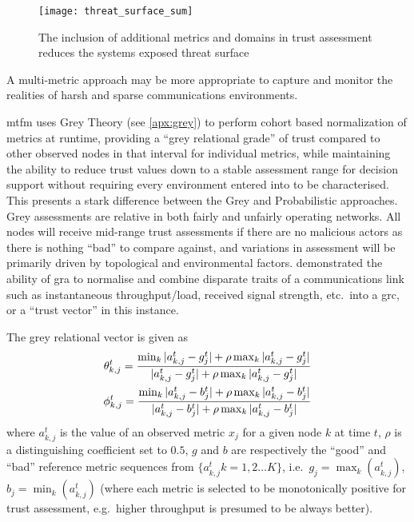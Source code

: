 \begin{figure}[h!]
  \centering
  \texttt{[image: threat\_surface\_sum]}
  \caption{The inclusion of additional metrics and domains in trust assessment reduces the systems exposed threat surface}
  \label{fig:threat_surface}
\end{figure}

A multi-metric approach may be more appropriate to capture and monitor the realities of harsh and sparse communications environments.

\gls{mtfm}\cite{Guo11} uses Grey Theory (see \autoref{apx:grey}) to perform cohort based normalization of metrics at runtime, providing a ``grey relational grade'' of trust compared to other observed nodes in that interval for individual metrics, while maintaining the ability to reduce trust values down to a stable assessment range for decision support without requiring every environment entered into to be characterised.
This presents a stark difference between the Grey and Probabilistic approaches.
Grey assessments are relative in both fairly and unfairly operating networks.
All nodes will receive mid-range trust assessments if there are no malicious actors as there is nothing ``bad'' to compare against, and variations in assessment will be primarily driven by topological and environmental factors.
\citet{Guo11} demonstrated the ability of \gls{gra} to normalise and combine disparate traits of a communications link such as instantaneous throughput/load, received signal strength, etc.\ into a \gls{grc}, or a ``trust vector'' in this instance.

The grey relational vector is given as
%
\begin{align}
  \label{eq:grc}
  \theta_{k,j}^t = \frac{\min_k|a_{k,j}^t - g_j^t| + \rho \max_k|a_{k,j}^t-g_j^t|}{|a_{k,j}^t-g_j^t| + \rho \max_k|a_{k,j}^t-g_j^t|} \\
  \phi_{k,j}^t = \frac{\min_k|a_{k,j}^t - b_j^t| + \rho \max_k|a_{k,j}^t-b_j^t|}{|a_{k,j}^t-b_j^t| + \rho \max_k|a_{k,j}^t-b_j^t|} \notag 
\end{align}
%
where $a_{k,j}^t$ is the value of an observed metric $x_j$ for a given node $k$ at time $t$, $\rho$ is a distinguishing coefficient set to $0.5$, $g$ and $b$ are respectively the ``good'' and ``bad'' reference metric sequences from $\{a_{k,j}^t k=1,2\dots K\}$, i.e.\ $g_j=\max_k({a_{k,j}^t})$,  $b_j=\min_k({a_{k,j}^t})$ (where each metric is selected to be monotonically positive for trust assessment, e.g.\ higher throughput is presumed to be always better).

